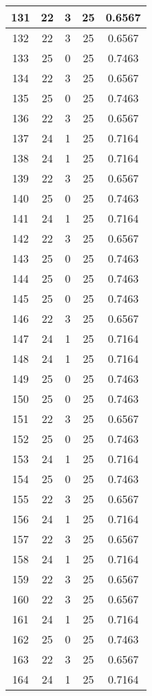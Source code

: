 \documentclass[letterpaper, 12pt]{article}
\begin{document}
\begin{longtable}{|c|c|c|c|c|}
\hline
131 & 22 & 3 & 25 & 0.6567 \\
\hline
132 & 22 & 3 & 25 & 0.6567 \\
\hline
133 & 25 & 0 & 25 & 0.7463 \\
\hline
134 & 22 & 3 & 25 & 0.6567 \\
\hline
135 & 25 & 0 & 25 & 0.7463 \\
\hline
136 & 22 & 3 & 25 & 0.6567 \\
\hline
137 & 24 & 1 & 25 & 0.7164 \\
\hline
138 & 24 & 1 & 25 & 0.7164 \\
\hline
139 & 22 & 3 & 25 & 0.6567 \\
\hline
140 & 25 & 0 & 25 & 0.7463 \\
\hline
141 & 24 & 1 & 25 & 0.7164 \\
\hline
142 & 22 & 3 & 25 & 0.6567 \\
\hline
143 & 25 & 0 & 25 & 0.7463 \\
\hline
144 & 25 & 0 & 25 & 0.7463 \\
\hline
145 & 25 & 0 & 25 & 0.7463 \\
\hline
146 & 22 & 3 & 25 & 0.6567 \\
\hline
147 & 24 & 1 & 25 & 0.7164 \\
\hline
148 & 24 & 1 & 25 & 0.7164 \\
\hline
149 & 25 & 0 & 25 & 0.7463 \\
\hline
150 & 25 & 0 & 25 & 0.7463 \\
\hline
151 & 22 & 3 & 25 & 0.6567 \\
\hline
152 & 25 & 0 & 25 & 0.7463 \\
\hline
153 & 24 & 1 & 25 & 0.7164 \\
\hline
154 & 25 & 0 & 25 & 0.7463 \\
\hline
155 & 22 & 3 & 25 & 0.6567 \\
\hline
156 & 24 & 1 & 25 & 0.7164 \\
\hline
157 & 22 & 3 & 25 & 0.6567 \\
\hline
158 & 24 & 1 & 25 & 0.7164 \\
\hline
159 & 22 & 3 & 25 & 0.6567 \\
\hline
160 & 22 & 3 & 25 & 0.6567 \\
\hline
161 & 24 & 1 & 25 & 0.7164 \\
\hline
162 & 25 & 0 & 25 & 0.7463 \\
\hline
163 & 22 & 3 & 25 & 0.6567 \\
\hline
164 & 24 & 1 & 25 & 0.7164 \\

\end{longtable}
\end{document}

